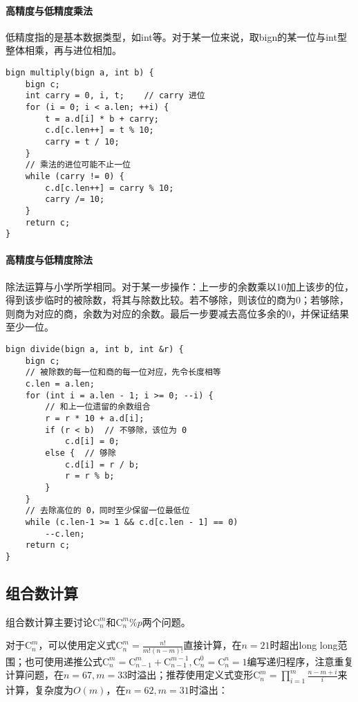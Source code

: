 \paragraph{高精度与低精度乘法}

低精度指的是基本数据类型，如int等。对于某一位来说，取bign的某一位与int型整体相乘，再与进位相加。

\begin{lstlisting}
bign multiply(bign a, int b) {
	bign c;
	int carry = 0, i, t;	// carry 进位
	for (i = 0; i < a.len; ++i) {
		t = a.d[i] * b + carry;
		c.d[c.len++] = t % 10;
		carry = t / 10;
	}
	// 乘法的进位可能不止一位
	while (carry != 0) {
		c.d[c.len++] = carry % 10;
		carry /= 10;
	}
	return c;
}
\end{lstlisting}

\paragraph{高精度与低精度除法}

除法运算与小学所学相同。对于某一步操作：上一步的余数乘以10加上该步的位，得到该步临时的被除数，将其与除数比较。若不够除，则该位的商为0；若够除，则商为对应的商，余数为对应的余数。最后一步要减去高位多余的0，并保证结果至少一位。

\begin{lstlisting}
bign divide(bign a, int b, int &r) {
	bign c;
	// 被除数的每一位和商的每一位对应，先令长度相等
	c.len = a.len;
	for (int i = a.len - 1; i >= 0; --i) {
		// 和上一位遗留的余数组合
		r = r * 10 + a.d[i];	
		if (r < b)	// 不够除，该位为 0
			c.d[i] = 0;
		else {	// 够除
			c.d[i] = r / b;
			r = r % b;
		}
	}
	// 去除高位的 0，同时至少保留一位最低位
	while (c.len-1 >= 1 && c.d[c.len - 1] == 0)
		--c.len;
	return c;
}
\end{lstlisting}

\subsection{组合数计算}

组合数计算主要讨论$\textrm{C}_n^m$和$\textrm{C}_n^m\%p$两个问题。

对于$\textrm{C}_n^m$，可以使用定义式$\displaystyle {\textrm{C}_n^m=\frac{n!}{m!(n-m)!}}$直接计算，在$n=21$时超出long long范围；也可使用递推公式$\textrm{C}_n^m=\textrm{C}_{n-1}^{m}+\textrm{C}_{n-1}^{m-1},\textrm{C}_n^0=\textrm{C}_n^n=1$编写递归程序，注意重复计算问题，在$n=67,m=33$时溢出；推荐使用定义式变形$\displaystyle{\textrm{C}_n^m=\prod_{i=1}^{m}\frac{n-m+i}{i}}$来计算，复杂度为$O(m)$，在$n=62,m=31$时溢出：


